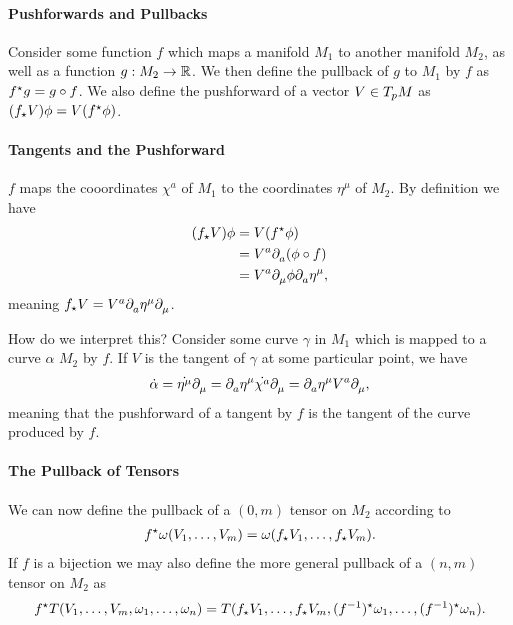 \paragraph{Pushforwards and Pullbacks}
Consider some function $f$ which maps a manifold $M_{1}$ to another manifold $M_{2}$, as well as a function $g: M_{2}\to\mathbb{R}$. We then define the pullback of $g$ to $M_{1}$ by $f$ as $f^{\star}g = g\circ f$. We also define the pushforward of a vector $V\in T_{p}M$ as $(f_{\star}V)\phi = V(f^{\star}\phi)$.

\paragraph{Tangents and the Pushforward}
$f$ maps the cooordinates $\chi^{a}$ of $M_{1}$ to the coordinates $\eta^{\mu}$ of $M_{2}$. By definition we have
\begin{align*}
(f_{\star}V)\phi &= V(f^{\star}\phi) \\
&= V^{a}\partial^{}_{a}(\phi\circ f) \\
&= V^{a}\partial^{}_{\mu}\phi\partial^{}_{a}\eta^{\mu},
\end{align*}
meaning $f_{\star}V = V^{a}\partial^{}_{a}\eta^{\mu}\partial^{}_{\mu}$.

How do we interpret this? Consider some curve $\gamma$ in $M_{1}$ which is mapped to a curve $\alpha$ $M_{2}$ by $f$. If $V$ is the tangent of $\gamma$ at some particular point, we have
\begin{align*}
\dot{\alpha} = \dot{\eta^{\mu}}\partial^{}_{\mu} = \partial^{}_{a}\eta^{\mu}\dot{\chi^{a}}\partial^{}_{\mu} = \partial^{}_{a}\eta^{\mu}V^{a}\partial^{}_{\mu},
\end{align*}
meaning that the pushforward of a tangent by $f$ is the tangent of the curve produced by $f$.

\paragraph{The Pullback of Tensors}
We can now define the pullback of a $(0, m)$ tensor on $M_{2}$ according to
\begin{align*}
f^{\star}\omega(V_{1}, \dots, V_{m}) = \omega(f_{\star}V_{1}, \dots, f_{\star}V_{m}).
\end{align*}
If $f$ is a bijection we may also define the more general pullback of a $(n, m)$ tensor on $M_{2}$ as
\begin{align*}
f^{\star}T(V_{1}, \dots, V_{m}, \omega_{1}, \dots, \omega_{n}) = T(f_{\star}V_{1}, \dots, f_{\star}V_{m}, (f^{-1})^{\star}\omega_{1}, \dots, (f^{-1})^{\star}\omega_{n}).
\end{align*}

